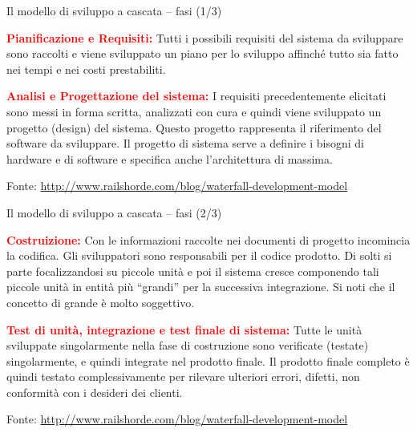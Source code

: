 \documentclass{beamer}
\begin{document}
\begin{frame}{\centerline{Il modello di sviluppo a cascata -- fasi (1/3)}}


\textcolor{red}{\bf Pianificazione e Requisiti:} Tutti i possibili requisiti del sistema da sviluppare sono raccolti e viene sviluppato un piano per lo sviluppo affinch\'{e} tutto sia fatto nei tempi e nei costi prestabiliti.
\newline

\textcolor{red}{\bf Analisi e Progettazione del sistema:} I requisiti precedentemente elicitati sono messi in forma scritta, analizzati con cura e quindi viene sviluppato un progetto (design) del sistema. Questo progetto rappresenta il riferimento del software da sviluppare. Il progetto di sistema serve a definire i bisogni di hardware e di software e specifica anche l'architettura di massima.
\newline

\begin{center}
\tiny
Fonte: \url{http://www.railshorde.com/blog/waterfall-development-model}
\end{center}

\end{frame}

\begin{frame}{\centerline{Il modello di sviluppo a cascata -- fasi (2/3)}}

\textcolor{red}{\bf Costruizione:} Con le informazioni raccolte nei documenti di progetto incomincia la codifica. Gli sviluppatori sono responsabili per il codice prodotto. Di solti si parte focalizzandosi su piccole unit\`{a} e poi il sistema cresce componendo tali piccole unit\`{a} in entit\`{a} pi\`{u} ``grandi'' per la successiva integrazione. Si noti che il concetto di grande \`{e} molto soggettivo.
\newline

\textcolor{red}{\bf Test di unit\`{a}, integrazione e test finale di sistema:} Tutte le unit\`{a} sviluppate singolarmente nella fase di costruzione sono verificate (testate) singolarmente, e quindi integrate nel prodotto finale. Il prodotto finale completo \`{e} quindi testato complessivamente per rilevare ulteriori errori, difetti, non conformit\`{a} con i desideri dei clienti.
\newline

\begin{center}
\tiny
Fonte: \url{http://www.railshorde.com/blog/waterfall-development-model}
\end{center}


\end{frame}
\end{document}
